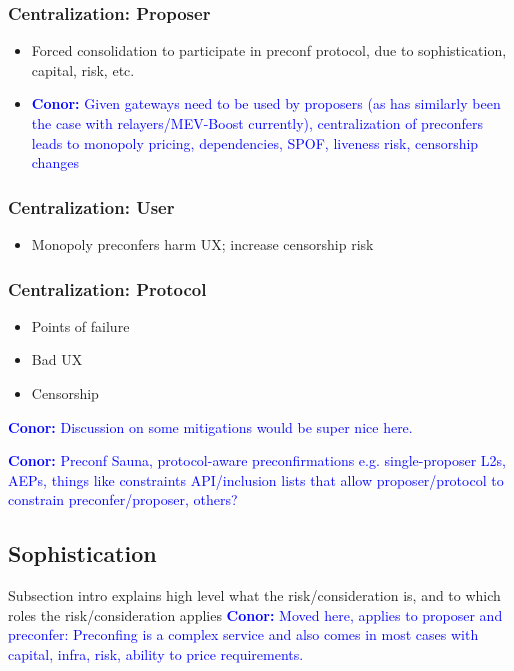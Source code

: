 \documentclass[a4paper]{article}
\theoremstyle{boldstyle}
\newcommand{\cm}[1]{\textcolor{blue}{\textbf{Conor:} #1}}
\begin{document}
    \subsubsection{Centralization: Proposer}
        \begin{itemize}
            \item Forced consolidation to participate in preconf protocol, due to sophistication, capital, risk, etc.
            \item \cm{Given gateways need to be used by proposers (as has similarly been the case with relayers/MEV-Boost currently), centralization of preconfers leads to monopoly pricing, dependencies, SPOF, liveness risk, censorship changes}
        \end{itemize}
    
    \subsubsection{Centralization: User}
        \begin{itemize}
            \item Monopoly preconfers harm UX; increase censorship risk
        \end{itemize}
    
    \subsubsection{Centralization: Protocol}
        \begin{itemize}
            \item Points of failure
            \item Bad UX
            \item Censorship
        \end{itemize}

    \cm{Discussion on some mitigations would be super nice here. }

    \cm{Preconf Sauna, protocol-aware preconfirmations e.g. single-proposer L2s, AEPs, things like constraints API/inclusion lists that allow proposer/protocol to constrain preconfer/proposer,  others?}

\subsection{Sophistication}
    Subsection intro explains high level what the risk/consideration is, and to which roles the risk/consideration applies
    \cm{Moved here, applies to proposer and preconfer: Preconfing is a complex service and also comes in most cases with capital, infra, risk, ability to price requirements.}
    
\end{document}
